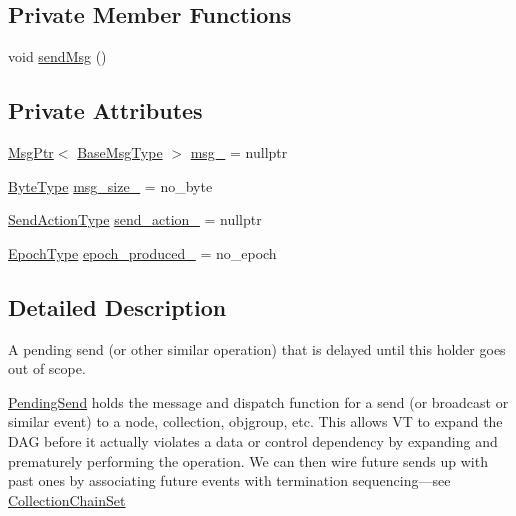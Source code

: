 \subsection*{Private Member Functions}
\begin{DoxyCompactItemize}
\item 
void \hyperlink{structvt_1_1messaging_1_1_pending_send_a93da625c74a5d35ca0b7dec3fad86152}{send\+Msg} ()
\end{DoxyCompactItemize}
\subsection*{Private Attributes}
\begin{DoxyCompactItemize}
\item 
\hyperlink{namespacevt_a9f5ebd62ee9d6dd8829e3e1cc4f858e9}{Msg\+Ptr}$<$ \hyperlink{namespacevt_a44d0d4e144748f2b19a1cfd962f50338}{Base\+Msg\+Type} $>$ \hyperlink{structvt_1_1messaging_1_1_pending_send_a6202f4243176b9189d9aef17aa108a36}{msg\+\_\+} = nullptr
\item 
\hyperlink{namespacevt_aab8d55968084610ce3b17057981e9300}{Byte\+Type} \hyperlink{structvt_1_1messaging_1_1_pending_send_a194f70cb3b0a136525a78bed573ab3be}{msg\+\_\+size\+\_\+} = no\+\_\+byte
\item 
\hyperlink{structvt_1_1messaging_1_1_pending_send_aa13248a342d68230048cde8e0756851c}{Send\+Action\+Type} \hyperlink{structvt_1_1messaging_1_1_pending_send_a0054d2fec8353438284dc02a28a73294}{send\+\_\+action\+\_\+} = nullptr
\item 
\hyperlink{namespacevt_a985a5adf291c34a3ca263b3378388236}{Epoch\+Type} \hyperlink{structvt_1_1messaging_1_1_pending_send_a77a8ad56dc73c0821c3fa4cef0b4c27a}{epoch\+\_\+produced\+\_\+} = no\+\_\+epoch
\end{DoxyCompactItemize}


\subsection{Detailed Description}
A pending send (or other similar operation) that is delayed until this holder goes out of scope. 

{\ttfamily \hyperlink{structvt_1_1messaging_1_1_pending_send}{Pending\+Send}} holds the message and dispatch function for a send (or broadcast or similar event) to a node, collection, objgroup, etc. This allows VT to expand the D\+AG before it actually violates a data or control dependency by expanding and prematurely performing the operation. We can then wire future sends up with past ones by associating future events with termination sequencing---see {\ttfamily \hyperlink{classvt_1_1messaging_1_1_collection_chain_set}{Collection\+Chain\+Set}} 


